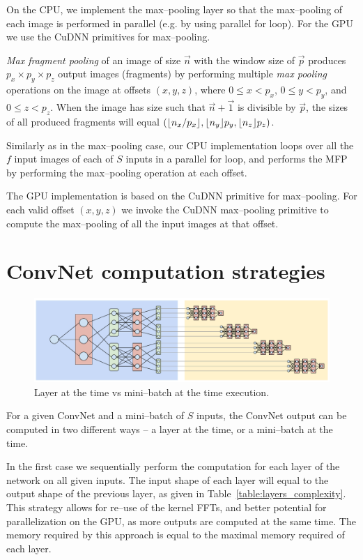 \documentclass[conference]{IEEEtran}
\DeclarePairedDelimiter{\floor}{\lfloor}{\rfloor}
\begin{document}
  On the CPU, we implement the max--pooling layer so that the
  max--pooling of each image is performed in parallel (e.g. by using
  parallel for loop).  For the GPU we use the CuDNN primitives for
  max--pooling.

  \emph{Max fragment pooling} of an image of size $\vec{n}$ with the
  window size of $\vec{p}$ produces $p_x \times p_y \times p_z$ output
  images (fragments) by performing multiple \emph{max pooling}
  operations on the image at offsets $(x,y,z)$, where $0 \le x < p_x$,
  $0 \le y < p_y$, and $0 \le z < p_z$.  When the image has size such
  that $\vec{n} + \vec{1}$ is divisible by $\vec{p}$, the sizes of all
  produced fragments will equal
  $(\floor{n_x/p_x},\floor{n_y}{p_y},\floor{n_z}{p_z})$.

  Similarly as in the max--pooling case, our CPU implementation loops
  over all the $f$ input images of each of $S$ inputs in a parallel
  for loop, and performs the MFP by performing the
  max--pooling operation at each offset.

  The GPU implementation is based on the CuDNN primitive for
  max--pooling.  For each valid offset $(x,y,z)$ we invoke the CuDNN
  max--pooling primitive to compute the max--pooling of all the input
  images at that offset.



\section{ConvNet computation strategies}

  \begin{figure}
    \centering
    \includegraphics[width=0.99\columnwidth]{fig/layer_vs_batch.pdf}
    \caption{Layer at the time vs mini--batch at the time execution.}
    \label{fig:executions}
  \end{figure}

  For a given ConvNet and a mini--batch of $S$ inputs, the ConvNet
  output can be computed in two different ways -- a layer at the time,
  or a mini--batch at the time.

  In the first case we sequentially perform the computation for each
  layer of the network on all given inputs.  The input shape of each
  layer will equal to the output shape of the previous layer, as given
  in Table~\ref{table:layers_complexity}.  This strategy allows for
  re--use of the kernel FFTs, and better potential for parallelization
  on the GPU, as more outputs are computed at the same time.  The
  memory required by this approach is equal to the maximal memory
  required of each layer.
\end{document}
